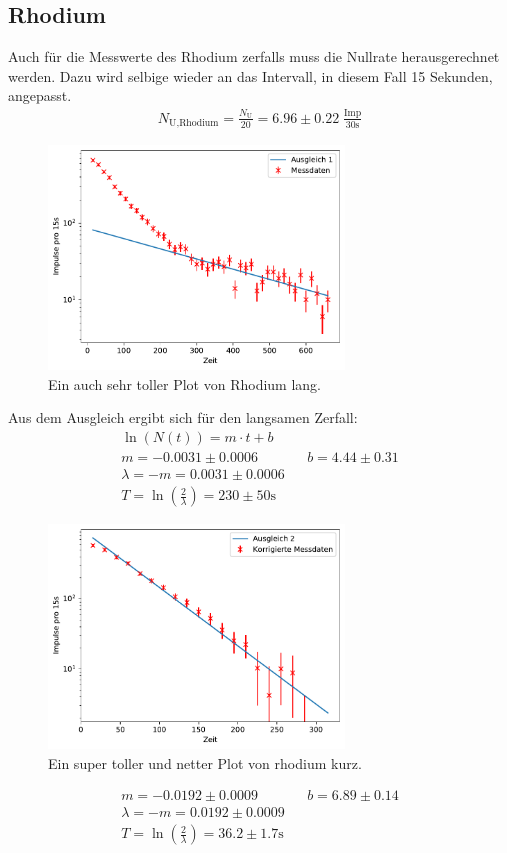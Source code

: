 \subsection{Rhodium}
Auch für die Messwerte des Rhodium zerfalls muss die Nullrate herausgerechnet werden.
Dazu wird selbige wieder an das Intervall, in diesem Fall 15 Sekunden, angepasst.
\begin{align*}
    N_{\text{U},\text{Rhodium}} =  \frac{N_{\text{U}}}{20} = 6.96 \pm 0.22 \; \frac{\text{Imp}}{30\text{s}}
\end{align*}
\begin{figure}
    \centering
    \includegraphics[width=0.7\textwidth]{plots/Rhodium_lang.pdf}
    \caption{Ein auch sehr toller Plot von Rhodium lang.}
\end{figure}
Aus dem Ausgleich ergibt sich für den langsamen Zerfall:
\begin{align*}
    \ln(N(t)) = m \cdot t + b\\
     m = -0.0031 \pm 0.0006 && b = 4.44 \pm 0.31 \\
    \lambda = -m = 0.0031 \pm 0.0006 \\
    T = \ln\left( \frac{2}{\lambda} \right) =  230 \pm 50 \text{s}
\end{align*}
\begin{figure}
    \centering
    \includegraphics[width=0.7\textwidth]{plots/Rhodium_kurz.pdf}
    \caption{Ein super toller und netter Plot von rhodium kurz.}
\end{figure}
\begin{align*}
     m = -0.0192 \pm 0.0009 && b = 6.89 \pm 0.14 \\
    \lambda = -m = 0.0192 \pm 0.0009 \\
    T = \ln\left( \frac{2}{\lambda} \right) = 36.2 \pm 1.7 \text{s}
\end{align*}
